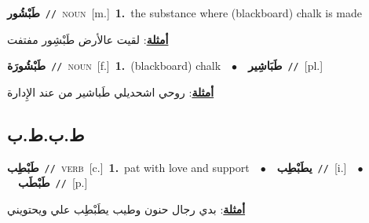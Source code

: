 \documentclass[10pt,a4paper,twoside]{article} %
\begin{document}
\begin{multicols}{2}
{{{{{{{{{{{{{\setlength\topsep{0pt}\textbf{\foreignlanguage{arabic}{طَبْشُور}}\ {\color{gray}\texttt{//}\color{black}}\ \textsc{noun}\ [m.]\ \textbf{1.}~the substance where (blackboard) chalk is made\  \begin{flushright}\color{gray}\foreignlanguage{arabic}{\textbf{\underline{\foreignlanguage{arabic}{أمثلة}}}: لقيت عالأرض طَبْشِور مفتفت}\end{flushright}\color{black}} \vspace{2mm}

{\setlength\topsep{0pt}\textbf{\foreignlanguage{arabic}{طَبْشُورَة}}\ {\color{gray}\texttt{//}\color{black}}\ \textsc{noun}\ [f.]\ \textbf{1.}~(blackboard) chalk\ \ $\bullet$\ \ \setlength\topsep{0pt}\textbf{\foreignlanguage{arabic}{طَبَاشِير}}\ {\color{gray}\texttt{//}\color{black}}\ [pl.]\  \begin{flushright}\color{gray}\foreignlanguage{arabic}{\textbf{\underline{\foreignlanguage{arabic}{أمثلة}}}: روحي اشحديلي طَباشير من عند الإِدارة}\end{flushright}\color{black}} \vspace{2mm}

\vspace{-3mm}
\subsection*{\color{blue}\foreignlanguage{arabic}{ط.ب.ط.ب}\color{blue}{}} 

{\setlength\topsep{0pt}\textbf{\foreignlanguage{arabic}{طَبْطِب}}\ {\color{gray}\texttt{//}\color{black}}\ \textsc{verb}\ [c.]\ \textbf{1.}~pat with love and support\ \ $\bullet$\ \ \setlength\topsep{0pt}\textbf{\foreignlanguage{arabic}{يطَبْطِب}}\ {\color{gray}\texttt{//}\color{black}}\ [i.]\ \ $\bullet$\ \ \setlength\topsep{0pt}\textbf{\foreignlanguage{arabic}{طَبْطَب}}\ {\color{gray}\texttt{//}\color{black}}\ [p.]\  \begin{flushright}\color{gray}\foreignlanguage{arabic}{\textbf{\underline{\foreignlanguage{arabic}{أمثلة}}}: بدي رجال حنون وطيب يطَبْطِب علي ويحتويني}\end{flushright}\color{black}} \vspace{2mm}

}}}}}}}}}}}}
\end{multicols}
\end{document}
